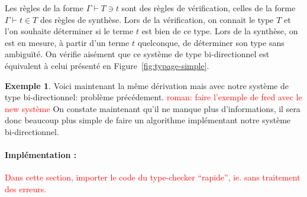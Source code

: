 \documentclass {article}
\theoremstyle{definition}
\newtheorem{example}{Exemple}
\theoremstyle{remark}
\newcommand{\todo}[1]{\textcolor{red}{#1}}
\begin{document}
Les règles de la forme \(\Gamma\vdash T \ni t\) sont des règles de
vérification, celles de la forme \(\Gamma\vdash t \in T\) des règles
de synthèse.  Lors de la vérification, on connait le type $T$ et
l'on souhaite déterminer si le terme $t$ est bien de ce
type. Lors de la synthèse, on est en mesure, à partir d'un terme
$t$ quelconque, de déterminer son type sans ambiguïté.  On vérifie
aisément que ce système de type bi-directionnel est équivalent à celui
présenté en Figure~\ref{fig:typage-simple}.

\begin{example}
  Voici maintenant la même dérivation mais avec notre système de type bi-directionnel:
  problème précédement.
  \todo{roman: faire l'exemple de fred avec le new système}
  On constate maintenant qu'il ne manque plus d'informations, il sera donc beaucoup plus simple
  de faire un algorithme implémentant notre système bi-directionnel.
\end{example}

\paragraph{Implémentation :}

\todo{Dans cette section, importer le code du type-checker ``rapide'', ie. sans traitement des erreurs.}
\end{document}
